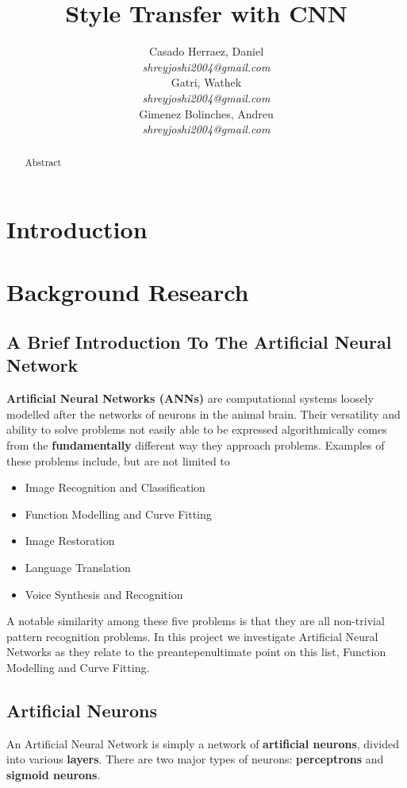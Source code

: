\documentclass{article}
\title{\textbf{Style Transfer with CNN}}
\author{
  Casado Herraez, Daniel \\
  \textit{shreyjoshi2004@gmail.com} \\
  \And
  Gatri, Wathek \\
  \textit{shreyjoshi2004@gmail.com} \\
  \And
  Gimenez Bolinches, Andreu \\
  \textit{shreyjoshi2004@gmail.com} \\
}
\begin{document}
\maketitle
\begin{abstract} \normalsize

Abstract

\end{abstract}



\vfill

\section{Introduction}

\section{Background Research}
\subsection{A Brief Introduction To The Artificial Neural Network}
\textbf{Artificial Neural Networks (ANNs)} are computational systems loosely modelled after the networks of neurons in the animal brain. Their versatility and ability to solve problems not easily able to be expressed algorithmically comes from the \textbf{fundamentally} different way they approach problems. Examples of these problems include, but are not limited to
\begin{itemize}
    \item Image Recognition and Classification
    \item Function Modelling and Curve Fitting
    \item Image Restoration
    \item Language Translation
    \item Voice Synthesis and Recognition
\end{itemize}

A notable similarity among these five problems is that they are all non-trivial pattern recognition problems. In this project we investigate Artificial Neural Networks as they relate to the preantepenultimate point on this list, Function Modelling and Curve Fitting.

\subsection{Artificial Neurons}
An Artificial Neural Network is simply a network of \textbf{artificial neurons}, divided into various \textbf{layers}.
There are two major types of neurons: \textbf{perceptrons} and \textbf{sigmoid neurons}.
\end{document}
